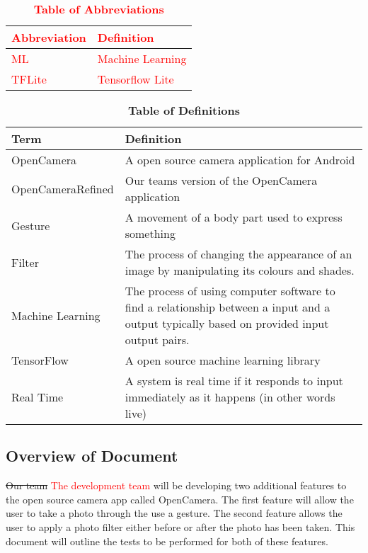 \documentclass[12pt, titlepage]{article}
\begin{document}
\begin{table}[hbp]
\caption{ \textcolor{red}{\textbf{Table of Abbreviations}}} \label{Table}

\begin{tabularx}{\textwidth}{p{3cm}X}
\toprule
\textbf{\textcolor{red}{Abbreviation}} & \textbf{\textcolor{red}{Definition}} \\
\midrule
\textcolor{red}{ML} & \textcolor{red}{Machine Learning}\\
\textcolor{red}{TFLite} & \textcolor{red}{Tensorflow Lite}\\
\bottomrule
\end{tabularx}

\end{table}

\begin{table}[!htbp]
\caption{\textbf{Table of Definitions}} \label{Table}

\begin{tabularx}{\textwidth}{p{4cm}X}
\toprule
\textbf{Term} & \textbf{Definition}\\
\midrule
OpenCamera & A open source camera application for Android\\
OpenCameraRefined & Our teams version of the OpenCamera application\\
Gesture & A movement of a body part used to express something\\
Filter & The process of changing the appearance of an image by manipulating its colours and shades.\\
Machine Learning & The process of using computer software to find a relationship between a input and a output typically based on provided input output pairs.\\
TensorFlow & A open source machine learning library\\
Real Time & A system is real time if it responds to input immediately as it happens (in other words live)\\
\bottomrule
\end{tabularx}

\end{table}	

\subsection{Overview of Document}
    \sout{Our team} \textcolor{red}{The development team} will be developing two additional features to the open source camera app called OpenCamera.  The first feature will allow the user to take a photo through the use a gesture. The second feature allows the user to apply a photo filter either before or after the photo has been taken. This document will outline the tests to be performed for both of these features.
\end{document}
